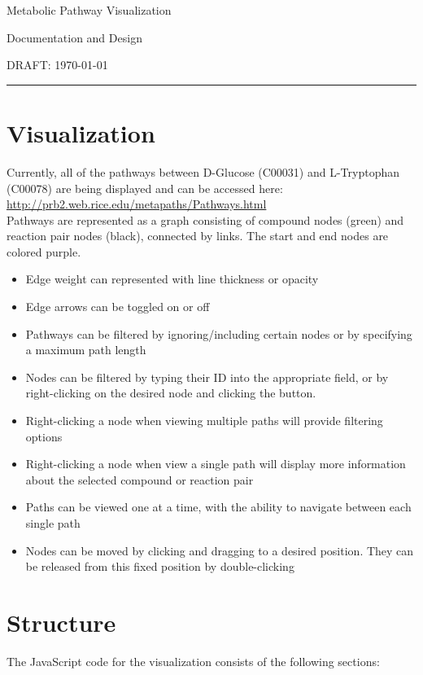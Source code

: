 \documentclass{article}
\begin{document}
	
	\begin{center}
		\doublespacing
		
		\LARGE{Metabolic Pathway Visualization}
		
		\Large{Documentation and Design}
		
		\large{DRAFT: \today}
		
		\rule{6.5in}{0.75pt}
	\end{center}
	
	\tableofcontents
	\onehalfspace
	
	\section{Visualization} %
	\label{sec:visualization}
		\noindent Currently, all of the pathways between D-Glucose (C00031) and L-Tryptophan (C00078) are being displayed and can be accessed here:  \url{http://prb2.web.rice.edu/metapaths/Pathways.html} \\
		
		\noindent Pathways are represented as a graph consisting of compound nodes (green) and reaction pair nodes (black), connected by links. The start and end nodes are colored purple. 
		\begin{itemize}
			\item{Edge weight can represented with line thickness or opacity}
			\item{Edge arrows can be toggled on or off}
			\item{Pathways can be filtered by ignoring/including certain nodes or by specifying a maximum path length}
			\item{Nodes can be filtered by typing their ID into the appropriate field, or by right-clicking on the desired node and clicking the button.}
			\item{Right-clicking a node when viewing multiple paths will provide filtering options}
			\item{Right-clicking a node when view a single path will display more information about the selected compound or reaction pair}
			\item{Paths can be viewed one at a time, with the ability to navigate between each single path}
			\item{Nodes can be moved by clicking and dragging to a desired position. They can be released from this fixed position by double-clicking}
		\end{itemize}
	
	
	\section{Structure} %
		\label{sub:structure}
		The JavaScript code for the visualization consists of the following sections:
			
\end{document}
